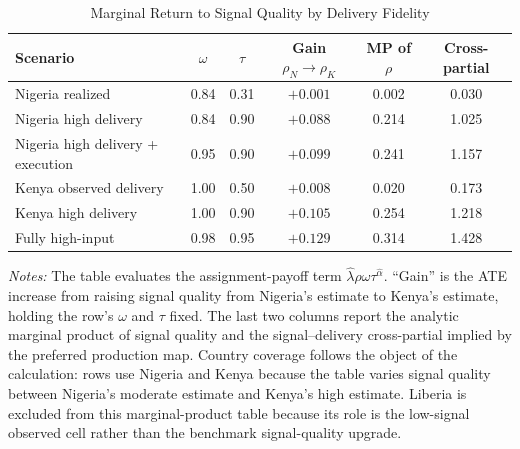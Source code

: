 \begin{table}[H]
\centering
\caption{Marginal Return to Signal Quality by Delivery Fidelity}
\label{tab:struct_signal_delivery_margins}
\begin{threeparttable}
\scriptsize
\setlength{\tabcolsep}{3pt}
\begin{tabular}[t]{>{\raggedright\arraybackslash}p{3.3cm}ccccc}
\toprule
Scenario & $\omega$ & $\tau$ & Gain $\rho_N\to\rho_K$ & MP of $\rho$ & Cross-partial \\
\midrule
Nigeria realized & 0.84 & 0.31 & $+0.001$ & 0.002 & 0.030 \\
Nigeria high delivery & 0.84 & 0.90 & $+0.088$ & 0.214 & 1.025 \\
Nigeria high delivery + execution & 0.95 & 0.90 & $+0.099$ & 0.241 & 1.157 \\
Kenya observed delivery & 1.00 & 0.50 & $+0.008$ & 0.020 & 0.173 \\
Kenya high delivery & 1.00 & 0.90 & $+0.105$ & 0.254 & 1.218 \\
Fully high-input & 0.98 & 0.95 & $+0.129$ & 0.314 & 1.428 \\
\bottomrule
\end{tabular}
\begin{tablenotes}
\footnotesize
\item \textit{Notes:} The table evaluates the assignment-payoff term $\hat{\lambda}\rho\omega\tau^{\hat{\alpha}}$. ``Gain'' is the ATE increase from raising signal quality from Nigeria's estimate to Kenya's estimate, holding the row's $\omega$ and $\tau$ fixed. The last two columns report the analytic marginal product of signal quality and the signal--delivery cross-partial implied by the preferred production map. Country coverage follows the object of the calculation: rows use Nigeria and Kenya because the table varies signal quality between Nigeria's moderate estimate and Kenya's high estimate. Liberia is excluded from this marginal-product table because its role is the low-signal observed cell rather than the benchmark signal-quality upgrade.
\end{tablenotes}
\end{threeparttable}
\end{table}
